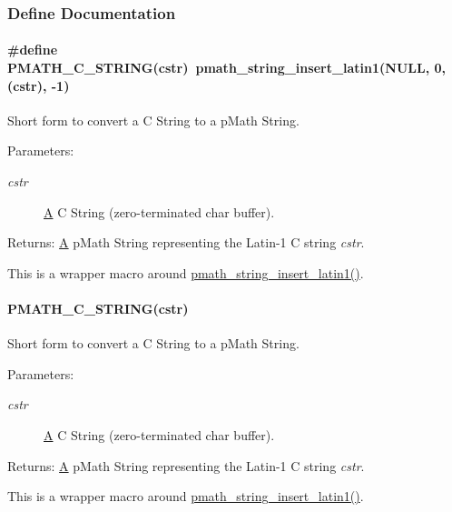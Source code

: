 \subsubsection{Define Documentation}
\hypertarget{group__strings_g0b6ecb1bc5d8aeccbbfaeb72055c7ffc}{
\paragraph[{PMATH\_\-C\_\-STRING}]{\setlength{\rightskip}{0pt plus 5cm}\#define PMATH\_\-C\_\-STRING(cstr)~pmath\_\-string\_\-insert\_\-latin1(NULL, 0, (cstr), -1)}\hfill}
\label{group__strings_g0b6ecb1bc5d8aeccbbfaeb72055c7ffc}


Short form to convert a C String to a pMath String. 

\begin{Desc}
\item[Parameters:]
\begin{description}
\item[{\em cstr}]\hyperlink{class_a}{A} C String (zero-terminated char buffer). \end{description}
\end{Desc}
\begin{Desc}
\item[Returns:]\hyperlink{class_a}{A} pMath String representing the Latin-1 C string {\em cstr\/}.\end{Desc}
This is a wrapper macro around \hyperlink{group__strings_g0016e7daa5ca421a48b6d8bd3c5f7ff5}{pmath\_\-string\_\-insert\_\-latin1()}. \hypertarget{group__strings_g63b8849d6cfcfa9d73bd404d7a4071c0}{
\paragraph[{PMATH\_\-C\_\-STRING}]{\setlength{\rightskip}{0pt plus 5cm}PMATH\_\-C\_\-STRING(cstr)}\hfill}
\label{group__strings_g63b8849d6cfcfa9d73bd404d7a4071c0}


Short form to convert a C String to a pMath String. 

\begin{Desc}
\item[Parameters:]
\begin{description}
\item[{\em cstr}]\hyperlink{class_a}{A} C String (zero-terminated char buffer). \end{description}
\end{Desc}
\begin{Desc}
\item[Returns:]\hyperlink{class_a}{A} pMath String representing the Latin-1 C string {\em cstr\/}.\end{Desc}
This is a wrapper macro around \hyperlink{group__strings_g0016e7daa5ca421a48b6d8bd3c5f7ff5}{pmath\_\-string\_\-insert\_\-latin1()}. 


